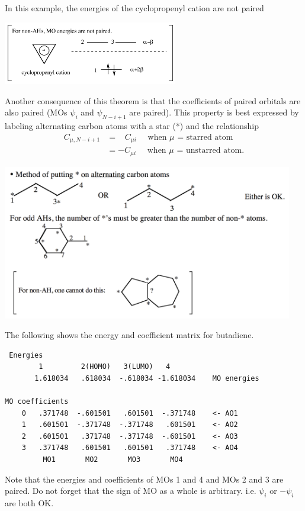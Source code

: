 \documentclass[../Main/chem532-notes.tex]{subfiles}
\begin{document}
\begin{example}
In this example, the energies of the cyclopropenyl cation are not paired

\includegraphics[width = 3in]{../huckel/c2_nonalternant.png}
\end{example}



Another consequence of this theorem is that the coefficients of paired orbitals are also paired (MOs $\psi_i$ and $\psi_{N-i+1}$ are paired). This property is best expressed by labeling alternating carbon atoms with a star (*) and the relationship
\begin{align}
C_{\mu, N - i + 1} &= \;\;\;C_{\mu i} \quad \text{ when $\mu$ = starred atom} \\
&= - C_{\mu i}  \quad \text{ when $\mu$ = unstarred atom}.
\end{align}

\includegraphics[width = 5in]{../huckel/c2_alternant.png}

\begin{example}
The following shows the energy and coefficient matrix for butadiene. 
\begin{verbatim}
 Energies
        1         2(HOMO)   3(LUMO)   4
       1.618034   .618034  -.618034 -1.618034    MO energies

MO coefficients
    0   .371748  -.601501   .601501  -.371748    <- AO1
    1   .601501  -.371748  -.371748   .601501    <- AO2
    2   .601501   .371748  -.371748  -.601501    <- AO3
    3   .371748   .601501   .601501   .371748    <- AO4
         MO1       MO2       MO3       MO4
\end{verbatim}
Note that the energies and coefficients of MOs 1 and 4 and MOs 2 and 3 are paired.
Do not forget that the sign of MO as a whole is arbitrary.  i.e. $\psi_i$ or $-\psi_i$ are both OK.
\end{example}
\end{document}
